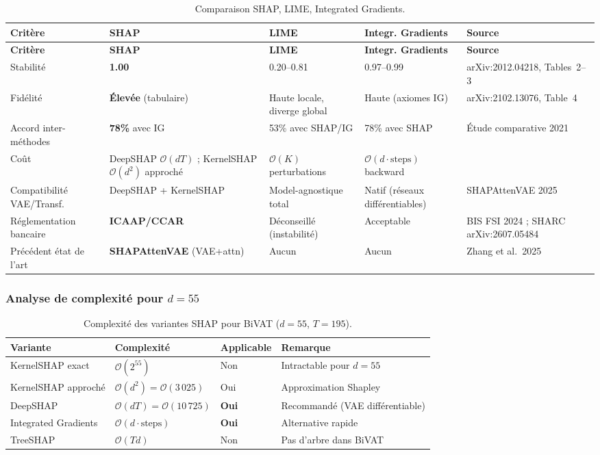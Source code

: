 \documentclass[12pt,a4paper]{article}
\begin{document}
\begin{longtable}{p{3cm}p{3cm}p{3cm}p{3cm}p{3.5cm}}
\caption{Comparaison SHAP, LIME, Integrated Gradients.}
\label{tab:d3}\\
\toprule
\textbf{Critère} & \textbf{SHAP} & \textbf{LIME} &
\textbf{Integr. Gradients} & \textbf{Source} \\
\midrule
\endfirsthead
\toprule
\textbf{Critère} & \textbf{SHAP} & \textbf{LIME} &
\textbf{Integr. Gradients} & \textbf{Source} \\
\midrule
\endhead
\bottomrule\endlastfoot
Stabilité & \textbf{1.00} & 0.20--0.81 & 0.97--0.99 &
arXiv:2012.04218, Tables~2--3 \\
\midrule
Fidélité & \textbf{Élevée} (tabulaire) & Haute locale, diverge global &
Haute (axiomes IG) &
arXiv:2102.13076, Table~4 \\
\midrule
Accord inter-méthodes & \textbf{78\%} avec IG & 53\% avec SHAP/IG &
78\% avec SHAP &
Étude comparative 2021 \\
\midrule
Coût & DeepSHAP $\mathcal{O}(dT)$ ;
KernelSHAP $\mathcal{O}(d^2)$ approché &
$\mathcal{O}(K)$ perturbations &
$\mathcal{O}(d \cdot \mathrm{steps})$ backward &
 \\
\midrule
Compatibilité VAE/Transf. & DeepSHAP + KernelSHAP &
Model-agnostique total &
Natif (réseaux différentiables) &
SHAPAttenVAE 2025 \\
\midrule
Réglementation bancaire & \textbf{ICAAP/CCAR} &
Déconseillé (instabilité) &
Acceptable &
BIS FSI 2024 ; SHARC arXiv:2607.05484 \\
\midrule
Précédent état de l'art & \textbf{SHAPAttenVAE} (VAE+attn) &
Aucun & Aucun &
Zhang et al.\ 2025 \\
\end{longtable}

\subsubsection{Analyse de complexité pour $d = 55$}

\begin{table}[ht]
\centering
\caption{Complexité des variantes SHAP pour BiVAT ($d=55$, $T=195$).}
\label{tab:complexite-d3}
\small
\begin{tabular}{p{3.5cm}p{3.5cm}p{1.8cm}p{4.5cm}}
\toprule
\textbf{Variante} & \textbf{Complexité} &
\textbf{Applicable} & \textbf{Remarque} \\
\midrule
KernelSHAP exact & $\mathcal{O}(2^{55})$ & Non &
Intractable pour $d=55$ \\
KernelSHAP approché & $\mathcal{O}(d^2) = \mathcal{O}(3\,025)$ & Oui &
Approximation Shapley \\
DeepSHAP & $\mathcal{O}(dT) = \mathcal{O}(10\,725)$ & \textbf{Oui} &
Recommandé (VAE différentiable) \\
Integrated Gradients & $\mathcal{O}(d \cdot \mathrm{steps})$ & \textbf{Oui} &
Alternative rapide \\
TreeSHAP & $\mathcal{O}(Td)$ & Non & Pas d'arbre dans BiVAT \\
\bottomrule
\end{tabular}
\end{table}
\end{document}
